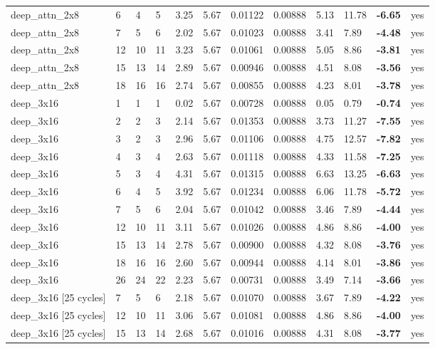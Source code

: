 \documentclass[10pt,a4paper]{article}
\begin{document}
\begin{landscape}
\begin{scriptsize}
\begin{longtable}{llllllllllll}
deep\_attn\_2x8 & 6 & 4 & 5 & 3.25 & 5.67 & 0.01122 & 0.00888 & 5.13 & 11.78 & \textbf{-6.65} & yes \\
deep\_attn\_2x8 & 7 & 5 & 6 & 2.02 & 5.67 & 0.01023 & 0.00888 & 3.41 & 7.89 & \textbf{-4.48} & yes \\
deep\_attn\_2x8 & 12 & 10 & 11 & 3.23 & 5.67 & 0.01061 & 0.00888 & 5.05 & 8.86 & \textbf{-3.81} & yes \\
deep\_attn\_2x8 & 15 & 13 & 14 & 2.89 & 5.67 & 0.00946 & 0.00888 & 4.51 & 8.08 & \textbf{-3.56} & yes \\
deep\_attn\_2x8 & 18 & 16 & 16 & 2.74 & 5.67 & 0.00855 & 0.00888 & 4.23 & 8.01 & \textbf{-3.78} & yes \\
deep\_3x16 & 1 & 1 & 1 & 0.02 & 5.67 & 0.00728 & 0.00888 & 0.05 & 0.79 & \textbf{-0.74} & yes \\
deep\_3x16 & 2 & 2 & 3 & 2.14 & 5.67 & 0.01353 & 0.00888 & 3.73 & 11.27 & \textbf{-7.55} & yes \\
deep\_3x16 & 3 & 2 & 3 & 2.96 & 5.67 & 0.01106 & 0.00888 & 4.75 & 12.57 & \textbf{-7.82} & yes \\
deep\_3x16 & 4 & 3 & 4 & 2.63 & 5.67 & 0.01118 & 0.00888 & 4.33 & 11.58 & \textbf{-7.25} & yes \\
deep\_3x16 & 5 & 3 & 4 & 4.31 & 5.67 & 0.01315 & 0.00888 & 6.63 & 13.25 & \textbf{-6.63} & yes \\
deep\_3x16 & 6 & 4 & 5 & 3.92 & 5.67 & 0.01234 & 0.00888 & 6.06 & 11.78 & \textbf{-5.72} & yes \\
deep\_3x16 & 7 & 5 & 6 & 2.04 & 5.67 & 0.01042 & 0.00888 & 3.46 & 7.89 & \textbf{-4.44} & yes \\
deep\_3x16 & 12 & 10 & 11 & 3.11 & 5.67 & 0.01026 & 0.00888 & 4.86 & 8.86 & \textbf{-4.00} & yes \\
deep\_3x16 & 15 & 13 & 14 & 2.78 & 5.67 & 0.00900 & 0.00888 & 4.32 & 8.08 & \textbf{-3.76} & yes \\
deep\_3x16 & 18 & 16 & 16 & 2.60 & 5.67 & 0.00944 & 0.00888 & 4.14 & 8.01 & \textbf{-3.86} & yes \\
deep\_3x16 & 26 & 24 & 22 & 2.23 & 5.67 & 0.00731 & 0.00888 & 3.49 & 7.14 & \textbf{-3.66} & yes \\
deep\_3x16 [25 cycles] & 7 & 5 & 6 & 2.18 & 5.67 & 0.01070 & 0.00888 & 3.67 & 7.89 & \textbf{-4.22} & yes \\
deep\_3x16 [25 cycles] & 12 & 10 & 11 & 3.06 & 5.67 & 0.01081 & 0.00888 & 4.86 & 8.86 & \textbf{-4.00} & yes \\
deep\_3x16 [25 cycles] & 15 & 13 & 14 & 2.68 & 5.67 & 0.01016 & 0.00888 & 4.31 & 8.08 & \textbf{-3.77} & yes \\

\end{longtable}
\end{scriptsize}
\end{landscape}
\end{document}

